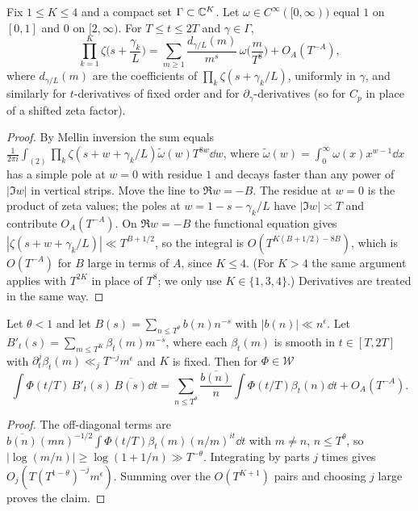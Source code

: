 \documentclass[11pt,colorlinks]{charlie}
\begin{document}
\begin{lemma}\label{lem:expansion}
Fix $1\le K\le4$ and a compact set $\Gamma\subset\mathbb{C}^K$. Let $\omega\in C^\infty([0,\infty))$ equal $1$ on $[0,1]$ and $0$ on $[2,\infty)$. For $T\le t\le2T$ and $\gamma\in\Gamma$,
\[
 \prod_{k=1}^K\zeta\Big(s+\frac{\gamma_k}L\Big)=\sum_{m\ge1}\frac{d_{\gamma/L}(m)}{m^{s}}\,\omega\Big(\frac m{T^8}\Big)+O_A(T^{-A}),
\]
where $d_{\gamma/L}(m)$ are the coefficients of $\prod_k\zeta(s+\gamma_k/L)$, uniformly in $\gamma$, and similarly for $t$-derivatives of fixed order and for $\partial_\gamma$-derivatives (so for $C_p$ in place of a shifted zeta factor).
\end{lemma}
\begin{proof}
By Mellin inversion the sum equals $\frac1{2\pi i}\int_{(2)}\prod_k\zeta(s+w+\gamma_k/L)\widetilde\omega(w)T^{8w}\dd w$, where $\widetilde\omega(w)=\int_0^\infty\omega(x)x^{w-1}\dd x$ has a simple pole at $w=0$ with residue $1$ and decays faster than any power of $|\Im w|$ in vertical strips. Move the line to $\Re w=-B$. The residue at $w=0$ is the product of zeta values; the poles at $w=1-s-\gamma_k/L$ have $|\Im w|\asymp T$ and contribute $O_A(T^{-A})$. On $\Re w=-B$ the functional equation gives $|\zeta(s+w+\gamma_k/L)|\ll T^{B+1/2}$, so the integral is $O(T^{K(B+1/2)-8B})$, which is $O(T^{-A})$ for $B$ large in terms of $A$, since $K\le4$. (For $K>4$ the same argument applies with $T^{2K}$ in place of $T^8$; we only use $K\in\{1,3,4\}$.) Derivatives are treated in the same way.
\end{proof}

\begin{lemma}\label{lem:shortside}
Let $\theta<1$ and let $B(s)=\sum_{n\le T^\theta}b(n)n^{-s}$ with $|b(n)|\ll n^{\epsilon}$. Let $B'_t(s)=\sum_{m\le T^{K}}\beta_t(m)m^{-s}$, where each $\beta_t(m)$ is smooth in $t\in[T,2T]$ with $\partial_t^j\beta_t(m)\ll_jT^{-j}m^{\epsilon}$ and $K$ is fixed. Then for $\Phi\in\mathcal W$
\[
 \int\Phi(t/T)\,B'_t(s)\,\overline{B(s)}\dd t=\sum_{n\le T^\theta}\frac{\overline{b(n)}}n\int\Phi(t/T)\beta_t(n)\dd t+O_A(T^{-A}).
\]
\end{lemma}
\begin{proof}
The off-diagonal terms are $\overline{b(n)}(mn)^{-1/2}\int\Phi(t/T)\beta_t(m)(n/m)^{it}\dd t$ with $m\ne n$, $n\le T^\theta$, so $|\log(m/n)|\ge\log(1+1/n)\gg T^{-\theta}$. Integrating by parts $j$ times gives $O_j(T(T^{1-\theta})^{-j}m^{\epsilon})$. Summing over the $O(T^{K+1})$ pairs and choosing $j$ large proves the claim.
\end{proof}
\end{document}
